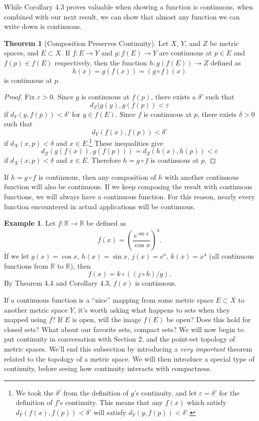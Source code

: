\documentclass{article}
\newcommand{\R}{\mathbb{R}}
\theoremstyle{definition}
\newtheorem{theorem}{Theorem}[section]
\newtheorem{example}{Example}[section]
\begin{document}
While Corollary 4.3 proves valuable when showing a function is continuous, when combined with our next result, we can show that almost any function we can write down is continuous.  
\begin{theorem}[Composition Preserves Continuity]
	Let $ X $, $ Y $, and $ Z $ be metric spaces, and $ E\subset X $. If $ f:E\to Y $ and $ g:f(E)\to Y $ are continuous at $ p\in E $ and $ f(p)\in f(E) $ respectively, then the function $ h:g(f(E))\to Z $ defined as  $$ h(x)=g(f(x))=(g\circ f)(x)$$ is continuous at $ p $. 
\end{theorem}
\begin{proof}
	Fix $ \varepsilon>0 $. Since $ g $ is continuous at $ f(p) $, there exists a $ \delta' $ such that $$d_Z(g(y),g(f(p))<\varepsilon $$ if $ d_Y(y,f(p))<\delta' $ for $ y\in f(E) $. Since $ f $ is continuous at $ p $, there exists $ \delta>0 $ such that $$d_Y(f(x),f(p))<\delta' $$ if $ d_X(x,p)<\delta $ and $ x\in E $.\footnote{We took the $ \delta' $ from the definition of $ g $'s continuity, and let $ \varepsilon=\delta' $ for the definition of $ f $'s continuity. This means that any $ f(x) $ which satisfy $ d_Y(f(x),f(p))<\delta'  $ will satisfy $ d_Y(y,f(p))<\delta' $.} These inequalities give $$d_Z(g(f(x)),g(f(p)))=d_Z(h(x),h(p))<\varepsilon $$ if $ d_X(x,p)<\delta $ and $ x\in E $. Therefore $ h=g\circ f $ is continuous at $ p $. 
\end{proof}
If $ h=g\circ f $ is continuous, then any composition of $ h $ with another continuous function will also be continuous. If we keep composing the result with continuous functions, we will always have a continuous function. For this reason, nearly every function encountered in actual applications will be continuous.   
\begin{example}
	Let $ f:\R\to\R $ be defined as $$ f(x)=\left(\frac{e^{\sin x}}{\cos x}\right)^4 .$$ If we let $ g(x)=\cos x $, $ h(x)=\sin  x $, $ j(x)=e^x $, $ k(x)=x^4 $ (all continuous functions from $ \R $ to $ \R $), then $$f(x)=k\circ((j\circ h)/g).$$ By Theorem 4.4 and Corollary 4.3, $ f(x) $ is continuous. 
\end{example}
If a continuous function is a ``nice'' mapping from some metric space $ E\subset X $ to another metric space $ Y $, it's worth asking what happens to sets when they mapped using $ f $? If $ E $ is open, will the image $ f(E) $ be open? Does this hold for closed sets? What about our favorite sets, compact sets? We will now begin to put continuity in conversation with Section 2, and the point-set topology of metric spaces. We'll end this subsection by introducing a \textit{very important} theorem related to the topology of a metric space. We will then introduce a special type of continuity, before seeing how continuity interacts with compactness.
\end{document}
